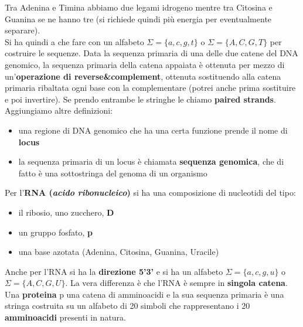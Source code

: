 \documentclass[a4paper,12pt, oneside]{book}
\begin{document}
Tra Adenina e Timina abbiamo due legami idrogeno mentre tra Citosina e Guanina
se ne hanno tre (si richiede quindi più energia per eventualmente separare).\\
Si ha quindi a che fare con un alfabeto $\Sigma=\{a,c,g,t\}$ o
$\Sigma=\{A,C,G,T\}$ per costruire le sequenze. Data la sequenza primaria di una
delle due catene del DNA genomico, la sequenza primaria della catena appaiata è
ottenuta per mezzo di un'\textbf{operazione di reverse\&complement}, ottenuta
sostituendo alla catena primaria ribaltata ogni base con la complementare
(potrei anche prima sostituire e poi invertire). Se
prendo entrambe le stringhe le chiamo \textbf{paired strands}.\\
Aggiungiamo altre definizioni:
\begin{itemize}
  \item una regione di DNA genomico che ha una certa funzione prende il nome di
  \textbf{locus}
  \item la sequenza primaria di un locus è chiamata \textbf{sequenza genomica},
  che di fatto è una sottostringa del genoma di un organismo
\end{itemize}
Per l'\textbf{RNA (\textit{acido ribonucleico})} si ha una composizione di
nucleotidi del tipo:
\begin{itemize}
  \item il ribosio, uno zucchero, \textbf{D}
  \item un gruppo fosfato, \textbf{p}
  \item una base azotata (Adenina, Citosina, Guanina, Uracile)
\end{itemize}
Anche per l'RNA si ha la \textbf{direzione 5'3'} e si ha un alfabeto
$\Sigma=\{a,c,g,u\}$ o $\Sigma=\{A,C,G,U\}$. La vera differenza è che l'RNA è
sempre in \textbf{singola catena}.\\
Una \textbf{proteina} p una catena di amminoacidi e la sua sequenza primaria è
una stringa costruita su un alfabeto di 20 simboli che rappresentano i 20
\textbf{amminoacidi} presenti in natura.
\end{document}
